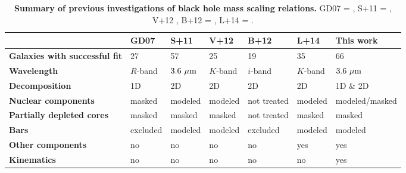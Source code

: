 \documentclass[preprint2]{emulateapj}
\begin{document}
\begin{table}%
\begin{center}  				      
\caption{{\bf Summary of previous investigations of black hole mass scaling relations.} 
GD07 = \cite{grahamdriver2007}, 
S+11 = \cite{sani2011}, V+12 \cite{vika2012}, B+12 = \cite{beifiori2012}, L+14 = \cite{lasker2014data}.}
\begin{tabular}{lllllll}
\hline
              & {\bf GD07}  & {\bf S+11}   & {\bf V+12} & {\bf B+12}   & {\bf L+14} & {\bf This work}	      \\ %
\hline
{\bf Galaxies with successful fit} & 27		     & 57	       & 25      & 19          & 35      & 66               \\
{\bf Wavelength}        	   & $R$-band	     & $3.6~\rm \mu m$ & $K$-band& $i$-band    & $K$-band& $3.6~\rm \mu m$  \\
{\bf Decomposition}     	   & 1D 	     & 2D	       & 2D	 & 2D	       & 2D	 & 1D \& 2D	    \\
{\bf Nuclear components}       	   & masked	     & modeled         & modeled & not treated & modeled & modeled/masked   \\
{\bf Partially depleted cores} 	   & masked	     & masked	       & masked  & not treated & masked  & masked	    \\ 
{\bf Bars}	        	   & excluded	     & modeled         & modeled & excluded    & modeled & modeled	    \\ 
{\bf Other components}  	   & no 	     & no 	       & no	 & no	       & yes	 & yes  	    \\ 
{\bf Kinematics}        	   & no 	     & no	       & no	 & no	       & no	 & yes  	    \\ %
\hline 
\end{tabular}
\label{tab:lit} 
\end{center}	
\end{table}
\end{document}
